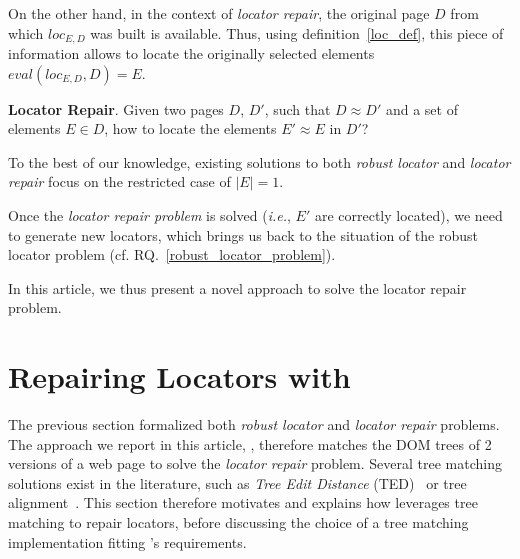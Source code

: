 On the other hand, in the context of \textit{locator repair}, the original page $D$ from which $loc_{E,D}$ was built is available.
Thus, using definition~\ref{loc_def}, this piece of information allows to locate the originally selected elements $eval(loc_{E,D}, D) = E$.

\begin{rqn}\label{locator_repair_problem}
    \textbf{Locator Repair}. 
    Given two pages $D$, $D'$, such that $D \approx D'$ and a set of elements $E\in D$, how to locate the elements $E' \approx E$ in $D'$?
\end{rqn}
To the best of our knowledge, existing solutions to both \emph{robust locator} and \emph{locator repair} focus on the restricted case of $|E| = 1$.

Once the \textit{locator repair problem} is solved (\emph{i.e.}, $E'$ are correctly located), we need to generate new locators, which brings us back to the situation of the robust locator problem (cf. RQ.~\ref{robust_locator_problem}).

In this article, we thus present a novel approach to solve the locator repair problem.


\section{Repairing Locators with \erratum}\label{sec:implementation}
The previous section formalized both \emph{robust locator} and \emph{locator repair} problems.
The approach we report in this article, \erratum, therefore matches the DOM trees of 2 versions of a web page to solve the \emph{locator repair} problem.
Several tree matching solutions exist in the literature, such as \emph{Tree Edit Distance} (TED)~\cite{tai1979tree} or tree alignment~\cite{jiang1994alignment}.
This section therefore motivates and explains how \erratum leverages tree matching to repair locators, before discussing the choice of a tree matching implementation fitting \erratum's requirements.

